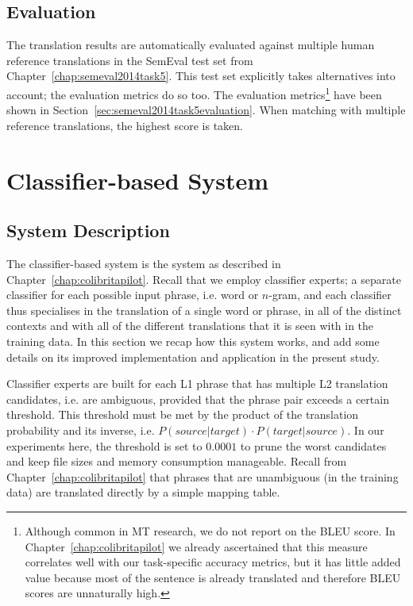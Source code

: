 \subsection{Evaluation}

The translation results are automatically evaluated against multiple human
reference translations in the SemEval test set from
Chapter~\ref{chap:semeval2014task5}. This test set explicitly takes alternatives
into account; the evaluation metrics do so too. The evaluation
metrics\footnote{Although common in MT research, we do not report on the BLEU \citep{BLEU} score. In
Chapter~\ref{chap:colibritapilot} we already ascertained that this measure correlates well with
our task-specific accuracy metrics, but it has little added value because most of the sentence is already
translated and therefore BLEU scores are unnaturally high.} have been shown in
Section~\ref{sec:semeval2014task5evaluation}. When matching with multiple reference translations, the highest
score is taken.

\section{Classifier-based System}

\label{sec:classifierbased}

\subsection{System Description}

The classifier-based system is the system as described in
Chapter~\ref{chap:colibritapilot}. Recall that we employ classifier experts; a
separate classifier for each possible input phrase, i.e. word or $n$-gram, and
each classifier thus specialises in the translation of a single word or phrase,
in all of the distinct contexts and with all of the different translations that
it is seen with in the training data. In this section we recap how this system
works, and add some details on its improved implementation and application in
the present study.

Classifier experts are built for each L1 phrase that has multiple L2
translation candidates, i.e. are ambiguous, provided that the phrase pair
exceeds a certain threshold. This threshold must be met by the product of the
translation probability and its inverse, i.e. $P(source|target) \cdot
P(target|source)$.  In our experiments here, the threshold is set to $0.0001$
to prune the worst candidates and keep file sizes and memory consumption
manageable. Recall from Chapter~\ref{chap:colibritapilot} that phrases that are
unambiguous (in the training data) are translated directly by a simple mapping
table.

